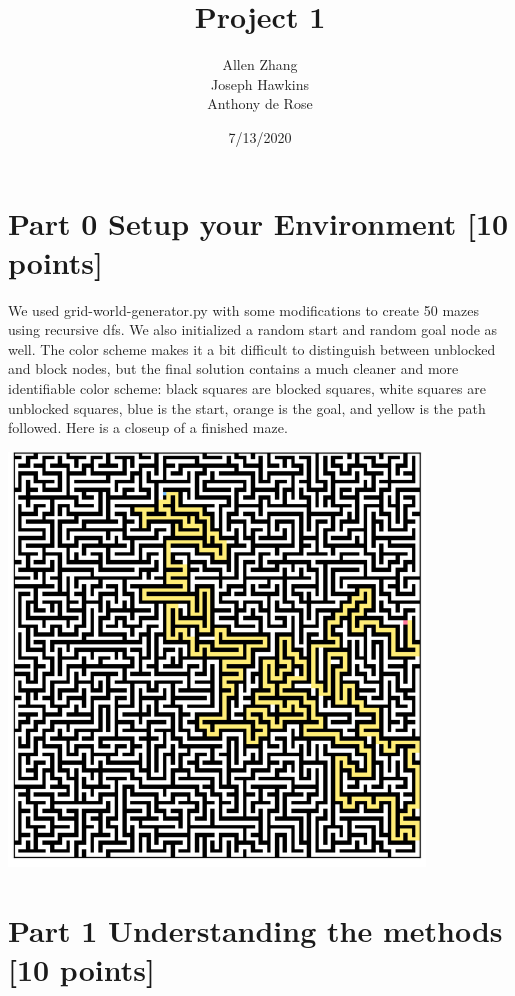 \documentclass[a4paper]{article}
\title{Project 1}
\author{Allen Zhang\\
        Joseph Hawkins\\
        Anthony de Rose \\
}
\date{7/13/2020}
\theoremstyle{definition}
\theoremstyle{plain}
\begin{document}
\maketitle


\section*{Part 0 Setup your Environment [10 points]}
We used grid-world-generator.py with some modifications to create 50 mazes using recursive dfs. We also initialized a random start and random goal node as well. The color scheme makes it a bit difficult to distinguish between unblocked and block nodes, but the final solution contains a much cleaner and more identifiable color scheme: black squares are blocked squares, white squares are unblocked squares, blue is the start, orange is the goal, and yellow is the path followed. Here is a closeup of a finished maze.\\
\begin{center}
\includegraphics[scale= .7]{part0.PNG}
\end{center}

\section*{Part 1 Understanding the methods [10 points]}
\end{document}
